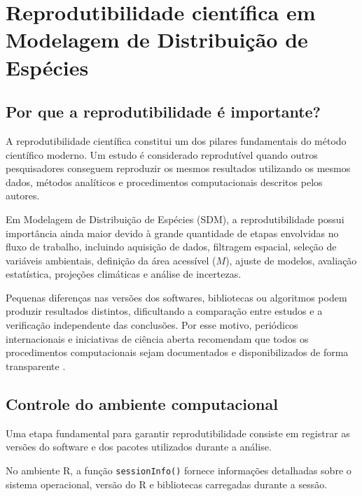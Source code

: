 \documentclass{ueap-sdm}
\begin{document}
\section{Reprodutibilidade científica em Modelagem de Distribuição de Espécies}

\subsection{Por que a reprodutibilidade é importante?}

A reprodutibilidade científica constitui um dos pilares fundamentais do método
científico moderno. Um estudo é considerado reprodutível quando outros
pesquisadores conseguem reproduzir os mesmos resultados utilizando os mesmos
dados, métodos analíticos e procedimentos computacionais descritos pelos autores.

Em Modelagem de Distribuição de Espécies (SDM), a reprodutibilidade possui
importância ainda maior devido à grande quantidade de etapas envolvidas no fluxo
de trabalho, incluindo aquisição de dados, filtragem espacial, seleção de
variáveis ambientais, definição da área acessível ($M$), ajuste de modelos,
avaliação estatística, projeções climáticas e análise de incertezas.

Pequenas diferenças nas versões dos softwares, bibliotecas ou algoritmos podem
produzir resultados distintos, dificultando a comparação entre estudos e a
verificação independente das conclusões. Por esse motivo, periódicos
internacionais e iniciativas de ciência aberta recomendam que todos os
procedimentos computacionais sejam documentados e disponibilizados de forma
transparente \citep{wilkinson2016fair, peng2011reproducible,
	sandve2013ten, zurell2020standard}.

\subsection{Controle do ambiente computacional}

Uma etapa fundamental para garantir reprodutibilidade consiste em registrar as
versões do software e dos pacotes utilizados durante a análise.

No ambiente R, a função \texttt{sessionInfo()} fornece informações detalhadas
sobre o sistema operacional, versão do R e bibliotecas carregadas durante a
sessão.
\end{document}
